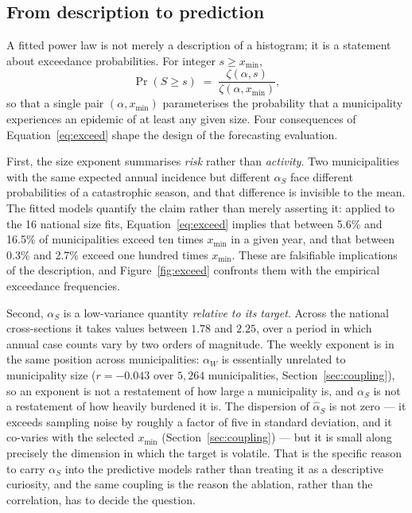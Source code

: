 \documentclass[english,10pt,b5paper]{article}
\begin{document}
\subsection{From description to prediction}
\label{sec:bridge}
\label{sec:targets}
\label{sec:regression}
\label{sec:classifier}

A fitted power law is not merely a description of a histogram; it is a statement
about exceedance probabilities. For integer $s \ge x_{\min}$,
%
\begin{equation}
\Pr(S \ge s) \;=\; \frac{\zeta(\alpha,s)}{\zeta(\alpha,x_{\min})},
\label{eq:exceed}
\end{equation}
%
so that a single pair $(\alpha, x_{\min})$ parameterises the probability that a
municipality experiences an epidemic of at least any given size. Four
consequences of Equation~\eqref{eq:exceed} shape the design of the forecasting
evaluation.

First, the size exponent summarises \emph{risk} rather than \emph{activity}. Two
municipalities with the same expected annual incidence but different $\alpha_S$
face different probabilities of a catastrophic season, and that difference is
invisible to the mean. The fitted models quantify the claim rather than merely
asserting it: applied to the 16 national size fits, Equation~\eqref{eq:exceed}
implies that between 5.6\% and 16.5\% of municipalities exceed ten times
$x_{\min}$ in a given year, and that between 0.3\% and 2.7\% exceed one hundred
times $x_{\min}$. These are falsifiable implications of the description, and
Figure~\ref{fig:exceed} confronts them with the empirical exceedance frequencies.

Second, $\alpha_S$ is a low-variance quantity \emph{relative to its target}.
Across the national cross-sections it takes values between $1.78$ and $2.25$,
over a period in which annual case counts vary by two orders of magnitude. The
weekly exponent is in the same position across municipalities: $\alpha_W$ is
essentially unrelated to municipality size ($r=-0.043$ over $5{,}264$
municipalities, Section~\ref{sec:coupling}), so an exponent is not a
restatement of how large a municipality is, and $\alpha_S$ is not a
restatement of how heavily burdened it is. The dispersion of $\hat\alpha_S$ is
not zero --- it exceeds sampling noise by roughly a factor of five in standard
deviation, and it co-varies with the selected $x_{\min}$
(Section~\ref{sec:coupling}) --- but it is small along precisely the dimension
in which the target is volatile. That is the specific reason to carry
$\alpha_S$ into the predictive models rather than treating it as a descriptive
curiosity, and the same coupling is the reason the ablation, rather than the
correlation, has to decide the question.
\end{document}
